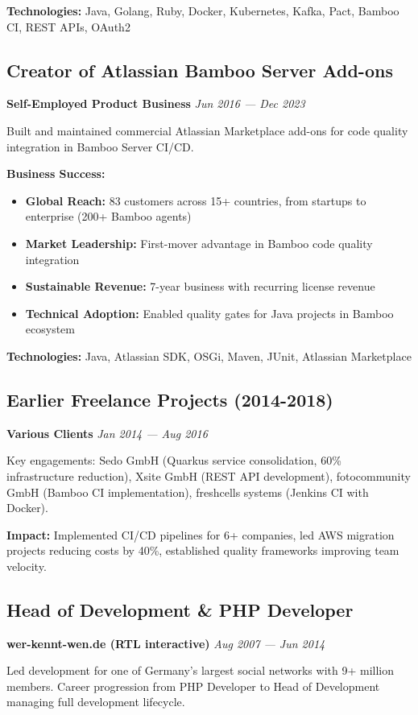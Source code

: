 \documentclass[10pt,a4paper]{article}
\newcommand{\achievement}[1]{\item \textbf{#1}}
\begin{document}
\textbf{Technologies:} Java, Golang, Ruby, Docker, Kubernetes, Kafka, Pact, Bamboo CI, REST APIs, OAuth2

\subsection{Creator of Atlassian Bamboo Server Add-ons}
\textbf{Self-Employed Product Business} \hfill \textit{Jun 2016 — Dec 2023}

Built and maintained commercial Atlassian Marketplace add-ons for code quality integration in Bamboo Server CI/CD.

\textbf{Business Success:}
\begin{itemize}
\achievement{Global Reach:} 83 customers across 15+ countries, from startups to enterprise (200+ Bamboo agents)
\achievement{Market Leadership:} First-mover advantage in Bamboo code quality integration
\achievement{Sustainable Revenue:} 7-year business with recurring license revenue
\achievement{Technical Adoption:} Enabled quality gates for Java projects in Bamboo ecosystem
\end{itemize}

\textbf{Technologies:} Java, Atlassian SDK, OSGi, Maven, JUnit, Atlassian Marketplace

\subsection{Earlier Freelance Projects (2014-2018)}
\textbf{Various Clients} \hfill \textit{Jan 2014 — Aug 2016}

Key engagements: Sedo GmbH (Quarkus service consolidation, 60\% infrastructure reduction), Xsite GmbH (REST API development), fotocommunity GmbH (Bamboo CI implementation), freshcells systems (Jenkins CI with Docker).

\textbf{Impact:} Implemented CI/CD pipelines for 6+ companies, led AWS migration projects reducing costs by 40\%, established quality frameworks improving team velocity.

\subsection{Head of Development \& PHP Developer}
\textbf{wer-kennt-wen.de (RTL interactive)} \hfill \textit{Aug 2007 — Jun 2014}

Led development for one of Germany's largest social networks with 9+ million members. Career progression from PHP Developer to Head of Development managing full development lifecycle.
\end{document}
